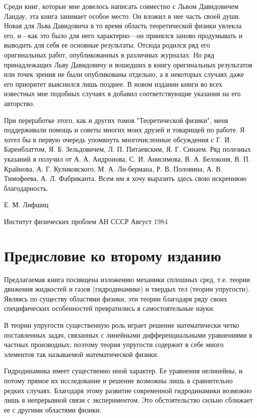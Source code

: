 Среди книг, которые мне довелось написать совместно с Львом Давидовичем Ландау,
эта книга занимает особое место. Он вложил в нее часть своей души. Новая для
Льва Давидовича в то время область теоретической физики увлекла его, и---как это
было для него характерно---он принялся заново продумывать и выводить для себя ее
основные результаты. Отсюда родился ряд его оригинальных работ, опубликованных в
различных журналах. Но ряд принадлежащих Льву Давидовичу и вошедших в книгу
оригинальных результатов или точек зрения не были опубликованы отдельно, а в
некоторых случаях даже его приоритет выяснился лишь позднее. В новом издании
книги во всех известных мне подобных случаях я добавил соответствующие указания
на его авторство.

При переработке этого, как и других томов "Теоретической физики", меня 
поддерживали помощь и советы многих моих друзей и товарищей по работе. Я хотел 
бы в первую очередь упомянуть многочисленные обсуждения с Г. И. Баренблаттом, 
Я. Б. Зельдовичем, Л. П. Питаевским, Я. Г. Синаем. Ряд полезных указаний я 
получил от А. А. Андронова, С. И. Анисимова, В. А. Белоконя, В. П. Крайнова, 
А. Г. Куликовского, М. А. Ли-бермана, Р. В. Половина, А. В. Тимофеева, 
А. Л. Фабриканта. Всем им я хочу выразить здесь свою искреннюю благодарность.

\begin{flushright}
Е. М. Лифшиц 
\end{flushright}
\begin{flushright}
Институт физических проблем АН СССР Август 1984
\end{flushright}

\chapter{Предисловие ко второму изданию}

Предлагаемая книга посвящена изложению механики сплошных сред, т.е. теории
движения жидкостей и газов (гидродинамике) и твердых тел (теории упругости).
Являясь по существу областями физики, эти теории благодаря ряду своих
специфических особенностей превратились в самостоятельные науки.

В теории упругости существенную роль играет решение математически четко
поставленных задач, связанных с линейными дифференциальными уравнениями в
частных производных; поэтому теория упругости содержит в себе много элементов
так называемой математической физики.

Гидродинамика имеет существенно иной характер. Ее уравнения нелинейны, и потому
прямое их исследование и решение возможны лишь в сравнительно редких случаях.
Благодаря этому развитие современной гидродинамики возможно лишь в непрерывной
связи с экспериментом. Это обстоятельство сильно сближает ее с другими областями
физики.

